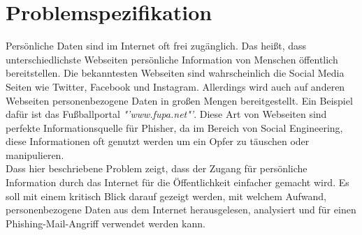 

\chapter{Problemspezifikation}  %
\label{cha:Problemspezifikation} %
Persönliche Daten sind im Internet oft frei zugänglich. Das heißt, dass unterschiedlichste Webseiten persönliche Information von Menschen öffentlich bereitstellen. Die bekanntesten Webseiten sind wahrscheinlich die Social Media Seiten wie Twitter, Facebook und Instagram. Allerdings wird auch auf anderen Webseiten personenbezogene Daten in großen Mengen bereitgestellt. Ein Beispiel dafür ist das Fußballportal \textit{"'www.fupa.net"'}. Diese Art von Webseiten sind perfekte Informationsquelle für Phisher, da im Bereich von Social Engineering, diese Informationen oft genutzt werden um ein Opfer zu täuschen oder manipulieren.\\
Dass hier beschriebene Problem zeigt, dass der Zugang für persönliche Information durch das Internet für die Öffentlichkeit einfacher gemacht wird. Es soll mit einem kritisch Blick darauf gezeigt werden, mit welchem Aufwand, personenbezogene Daten aus dem Internet herausgelesen, analysiert und für einen Phishing-Mail-Angriff verwendet werden kann.
